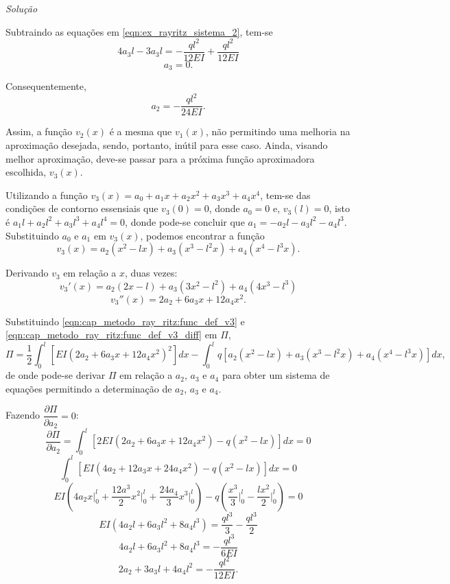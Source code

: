 \documentclass[
	12pt,				%
	openright,			%
    twoside,			%
	a4paper,			%
	chapter=TITLE,		%
	english,			%
	french,				%
	spanish,			%
	brazil				%
	]{abntex2}
\makeatletter
\renewenvironment{proof}[1][\proofname]{
	\par\pushQED{\qed}%
	\normalfont \topsep6\p@\@plus6\p@\relax
	\trivlist
	\item\relax
		{\itshape
			#1\@addpunct{.}}\hspace\labelsep\ignorespaces
}{%
	\popQED\endtrivlist\@endpefalse
}
\newenvironment{solution}{
	\begin{proof}[Solução]
}{%
	\end{proof}
}
\numberwithin{lema}{chapter}
\numberwithin{teorema}{chapter}
\numberwithin{definicao}{chapter}
\numberwithin{exemplo}{chapter}
\numberwithin{figure}{chapter}
\makeatother
\begin{document}
\begin{solution}
	Subtraindo as equações em \eqref{eqn:ex_rayritz_sistema_2}, tem-se
	$$
		4a_3l-3a_3l=-\frac{ql^2}{12EI}+\frac{ql^2}{12EI}
	$$
	$$
		a_3=0\text{.}
	$$
	
	Consequentemente,
	$$
		a_2=-\frac{ql^2}{24EI}
		\text{.}
	$$

	Assim, a função $v_2(x)$ é a mesma que $v_1(x)$, não permitindo uma melhoria na aproximação desejada, sendo, portanto, inútil para esse caso. Ainda, visando melhor aproximação, deve-se passar para a próxima função aproximadora escolhida, $v_3(x)$.
	
	Utilizando a função $v_3(x)=a_0+a_1x+a_2x^2+a_3x^3+a_4x^4$, tem-se das condições de contorno essensiais que $v_3(0)=0$, donde $a_0=0$ e, $v_3(l)=0$, isto é $a_1l+a_2l^2+a_3l^3+a_4l^4=0$, donde pode-se concluir que $a_1=-a_2l-a_3l^2-a_4l^3$. Substituindo $a_0$ e $a_1$ em $v_3(x)$, podemos encontrar a função
	\begin{equation}
		\label{eqn:cap_metodo_ray_ritz:func_def_v3}
		v_3(x)=
		a_2 (x^2 - lx)
		+
		a_3 (x^3 - l^2x)
		+
		a_4 (x^4 - l^3x)
		\text{.}
	\end{equation}
	
	Derivando $v_3$ em relação a $x$, duas vezes:
	$$
		v_3'(x)=
		a_2(2x - l)
		+
		a_3(3x^2 - l^2)
		+
		a_4(4x^3 - l^3)
	$$
	\begin{equation}
		\label{eqn:cap_metodo_ray_ritz:func_def_v3_diff}
		v_3''(x)=
		2a_2
		+
		6a_3 x
		+
		12a_4 x^2
		\text{.}
	\end{equation}
	
	Substituindo \eqref{eqn:cap_metodo_ray_ritz:func_def_v3} e \eqref{eqn:cap_metodo_ray_ritz:func_def_v3_diff} em $\Pi$,
	$$
		\Pi = \frac{1}{2} \int_0^l \left [
			EI(2a_2+6a_3x+12a_4x^2)^2
		\right ] dx
		-
		\int_0^l q \left [
			a_2(x^2 - lx)
			+
			a_3(x^3 - l^2x)
			+
			a_4(x^4 - l^3x)
		\right ] dx
		\text{,}
	$$
	de onde pode-se derivar $\Pi$ em relação a $a_2$, $a_3$ e $a_4$ para obter um sistema de equações permitindo a determinação de $a_2$, $a_3$ e $a_4$.
	
	Fazendo $\dfrac{\partial \Pi}{\partial a_2} = 0$:
	\begin{equation}
		\label{eqn:cap_metodo_ray_ritz:exemp_v3_diff_a2}
		\frac{\partial \Pi}{\partial a_2}
		=
		\int_0^l \left [
			2EI(2a_2 + 6a_3x + 12a_4x^2)
			-
			q(x^2 - lx)
		\right ] dx
		= 0
	\end{equation}
	$$
		\int_0^l \left [
			EI(4a_2 + 12a_3x + 24a_4x^2)
			-
			q(x^2 - lx)
		\right ] dx
		= 0
	$$
	$$
		EI \left (
			4a_2 x \Big |_0^l
			+
			\frac{12a^3}{2}x^2 \Big |_0^l
			+
			\frac{24a_4}{3}x^3 \Big |_0^l
		\right )
		- q
		\left (
			\frac{x^3}{3} \Big |_0^l
			-
			\frac{lx^2}{2} \Big |_0^l
		\right )
		= 0
	$$
	$$
		EI(4a_2l + 6a_3l^2 + 8a_4l^3)
		=
		\frac{ql^3}{3}
		-
		\frac{ql^3}{2}
	$$
	$$
		4a_2l + 6a_3l^2 + 8a_4l^3 = -\frac{ql^3}{6EI}
	$$
	\begin{equation}
		\label{eq:exemp_rayritz_approx3_eq1}
		2a_2 + 3a_3l + 4a_4l^2 = -\frac{ql^2}{12EI}
		\text{.}
	\end{equation}
		

\end{solution}
\end{document}
